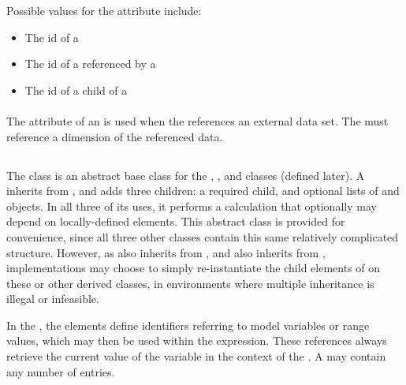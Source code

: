 \begin{blockChanged}
Possible values for the  attribute include:
\begin{itemize}
        \item The id of a \RepeatedTask
        \item The id of a \Task referenced by a \RepeatedTask
        \item The id of a \SubTask child of a \RepeatedTask
\end{itemize}

\paragraph*{}
The  attribute of an \AppliedDimension is used when the \Variable references an external data set.  The  must reference a dimension of the referenced data.


\subsection{}
\label{class:calculation}
\label{class:listOfVariables}
\label{class:listOfParameters}

The \Calculation class is an abstract base class for the \ComputeChange, \DataGenerator, and \FunctionalRange classes (defined later).  A \Calculation inherits from \SedBase, and adds three children:  a required \Math child, and optional lists of \Variable and \Parameter objects.  In all three of its uses, it performs a calculation that optionally may depend on locally-defined elements.  This abstract class is provided for convenience, since all three other classes contain this same relatively complicated structure.  However, as \FunctionalRange also inherits from \Range, and \ComputeChange also inherits from \Change, implementations may choose to simply re-instantiate the child elements of \Calculation on these or other derived classes, in environments where multiple inheritance is illegal or infeasible.


In the \ListOfVariables, the \Variable elements define identifiers referring to model variables or range values, which may then be used within the \Math expression. These references always retrieve the current value of the variable in the context of the \Calculation.  A \ListOfVariables may contain any number of \Variable entries.


\end{blockChanged}
